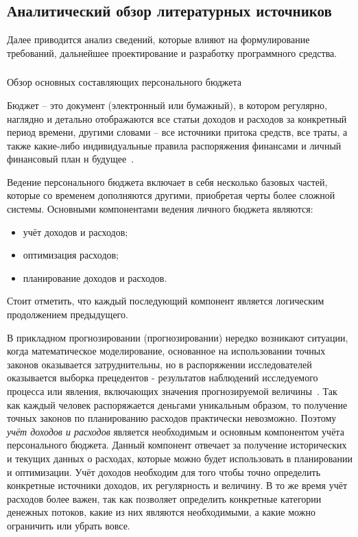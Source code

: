 \subsection{Аналитический обзор литературных источников}
\label{sec:analysis:literature}

Далее приводится анализ сведений, которые влияют на формулирование требований, дальнейшее проектирование и разработку программного средства.

\subsubsection{} Обзор основных составляющих персонального бюджета
\label{sec:analysis:literature:components}

Бюджет -- это документ (электронный или бумажный), в котором регулярно, наглядно и детально отображаются все статьи доходов и расходов за конкретный период времени, другими словами -- все источники притока средств, все траты, а также какие-либо индивидуальные правила распоряжения финансами и личный финансовый план н будущее~\cite{budget_blog}.

Ведение персонального бюджета включает в себя несколько базовых частей, которые со временем дополняются другими, приобретая черты более сложной системы.
Основными компонентами ведения личного бюджета являются:
\begin{itemize}
    \item учёт доходов и расходов;
    \item оптимизация расходов;
    \item планирование доходов и расходов.
\end{itemize}

Стоит отметить, что каждый последующий компонент является логическим продолжением предыдущего.

В прикладном прогнозировании (прогнозировании) нередко возникают ситуации, когда математическое моделирование, основанное на использовании точных законов оказывается затруднительны, но в распоряжении исследователей оказывается выборка прецедентов - результатов наблюдений исследуемого процесса или явления, включающих значения прогнозируемой величины~\cite{prediction_basics}.
Так как каждый человек распоряжается деньгами уникальным образом, то получение точных законов по планированию расходов практически невозможно.
Поэтому \emph{учёт доходов и расходов} является необходимым и основным компонентом учёта персонального бюджета.
Данный компонент отвечает за получение исторических и текущих данных о расходах, которые можно будет использовать в планировании и оптимизации.
Учёт доходов необходим для того чтобы точно определить конкретные источники доходов, их регулярность и величину.
В то же время учёт расходов более важен, так как позволяет определить конкретные категории денежных потоков, какие из них являются необходимыми, а какие можно ограничить или убрать вовсе.

